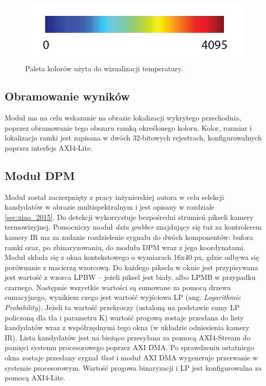 \begin{figure}
\centering
\includegraphics[width=0.5\linewidth]{images/jetPalet.png}
\caption[Paleta kolorów użyta do wizualizacji temperatury.]{ Paleta kolorów użyta do wizualizacji temperatury.}
\label{fig:jetPalet}
\end{figure}
\subsection{Obramowanie wyników}
Moduł ma na celu wskazanie na obrazie lokalizacji wykrytego przechodnia, poprzez obramowanie tego obszaru ramką określonego koloru. Kolor, rozmiar i lokalizacja ramki jest zapisana w dwóch 32-bitowych rejestrach, konfigurowalnych poprzez interfejs AXI4-Lite. 
\subsection{Moduł DPM}
Moduł został zaczerpnięty z pracy inżynierskiej autora w celu selekcji kandydatów w obrazie multispektralnym i jest opisany w rozdziale \ref {sec:xiao_2015}.  Do detekcji wykorzystuje bezpośredni strumień pikseli kamery termowizyjnej. Pomocniczy moduł \textit{data grabber} znajdujący się tuż za kontrolerem kamery IR ma za zadanie rozdzielenie sygnału do dwóch komponentów: bufora ramki oraz, po zbinaryzowaniu, do modułu DPM wraz z jego koordynatami. Moduł składa się z okna kontekstowego o wymiarach 16x40 px, gdzie odbywa się porównanie z macierzą wzorcową. Do każdego piksela w oknie jest przypisywana jest wartość z wzorca LPBW – jeżeli piksel jest biały, albo LPMB w przypadku czarnego. Następnie wszystkie wartości są sumowane za pomocą drzewa sumacyjnego, wynikiem czego jest wartość wyjściowa LP (ang. \textit{Logarithmic Probability}). Jeżeli ta wartość przekroczy (ustaloną na podstawie sumy LP policzoną dla tła i parametru K) wartość progową zostaje przesłana do listy kandydatów wraz z współrzędnymi tego okna (w układzie odniesienia kamery IR). Lista kandydatów jest na bieżąco przesyłana za pomocą AXI4-Stream do pamięci systemu procesorowego poprzez AXI DMA. Po sprawdzeniu ostatniego okna zostaje przesłany sygnał \textit{tlast} i moduł AXI DMA wygeneruje przerwanie w systemie procesorowym. Wartość progowa binaryzacji i LP jest konfigurowalna za pomocą AXI4-Lite.
